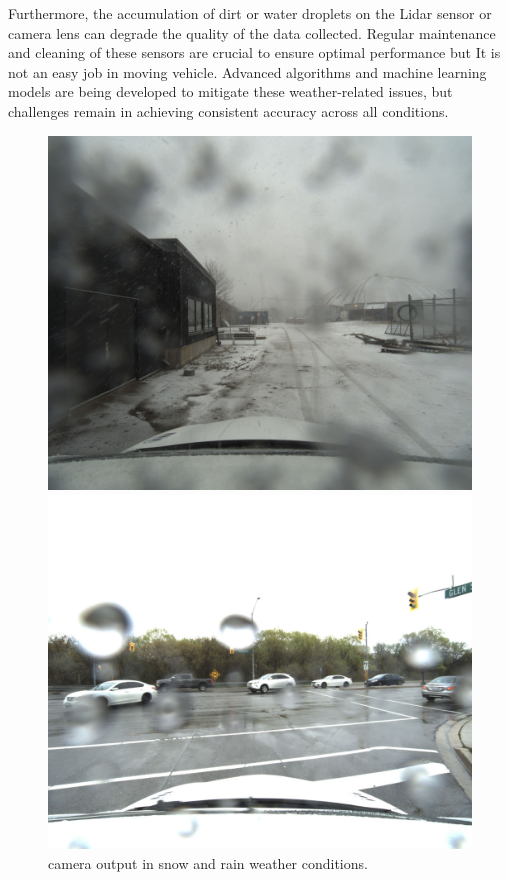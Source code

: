 Furthermore, the accumulation of dirt or water droplets on the Lidar sensor or camera lens can degrade the quality of the data collected. Regular maintenance and cleaning of these sensors are crucial to ensure optimal performance but It is not an easy job in  moving vehicle. Advanced algorithms and machine learning models are being developed to mitigate these weather-related issues, but challenges remain in achieving consistent accuracy across all conditions.
\begin{figure}[!ht]
	\begin{minipage}[t]{.45\linewidth}
		
		
		\includegraphics[width=\linewidth]{imgs/1611676774731026.png}
	\end{minipage}\hfill
	\begin{minipage}[b]{.45\linewidth}
		\includegraphics[width=\linewidth]{imgs/1619726918389964.jpg}
		
	\end{minipage}
	\caption{camera output in snow and rain weather conditions.}
	
	\label{img:rickety-camera}
\end{figure}

